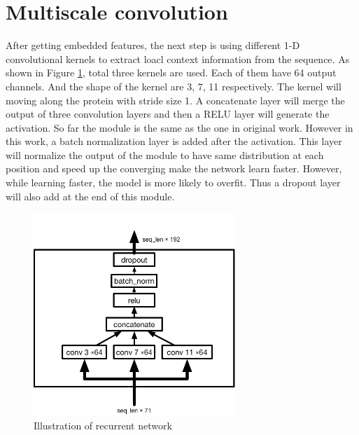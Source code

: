\section{Multiscale convolution}
After getting embedded features, the next step is using different 1-D convolutional kernels to extract loacl context information from the sequence. As shown in Figure \ref{fig:multi_conv}, total three kernels are used. Each of them have 64 output channels. And the shape of the kernel are 3, 7, 11 respectively. The kernel will moving along the protein with stride size 1. A concatenate layer will merge the output of three convolution layers and then a RELU layer will generate the activation. So far the module is the same as the one in original work. However in this work, a batch normalization layer is added after the activation. This layer will normalize the output of the module to have same distribution at each position and speed up the converging make the network learn faster. However, while learning faster, the model is more likely to overfit. Thus a dropout layer will also add at the end of this module.\par
\begin{figure}[H] 
	\centering
	\includegraphics[width=3in]{Figures/multiscale_conv}
	\caption[Detail inside recurrent unit]{Illustration of recurrent network}
	\label{fig:multi_conv}
\end{figure}

